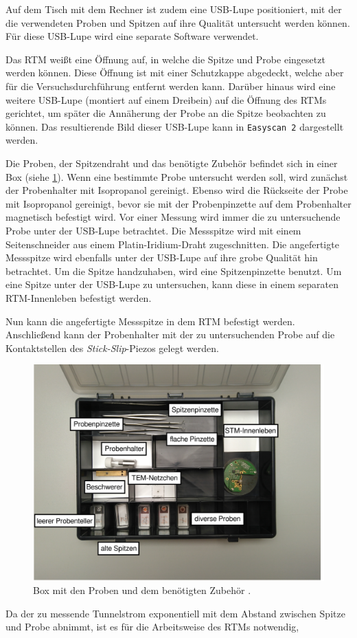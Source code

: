 Auf dem Tisch mit dem Rechner ist zudem eine USB-Lupe positioniert, mit der die verwendeten Proben und Spitzen auf ihre Qualität untersucht werden können.
Für diese USB-Lupe wird eine separate Software verwendet.\par
Das RTM weißt eine Öffnung auf, in welche die Spitze und Probe eingesetzt werden können. Diese Öffnung ist mit einer Schutzkappe abgedeckt, welche aber für
die Versuchsdurchführung entfernt werden kann. Darüber hinaus wird eine weitere USB-Lupe (montiert auf einem Dreibein) auf die Öffnung des RTMs gerichtet,
um später die Annäherung der Probe an die Spitze beobachten zu können. Das resultierende Bild dieser USB-Lupe kann in \texttt{Easyscan 2} dargestellt werden.\par
Die Proben, der Spitzendraht und das benötigte Zubehör befindet sich in einer Box (siehe \cref{fig:koffer}). Wenn eine bestimmte Probe untersucht werden soll,
wird zunächst der Probenhalter mit Isopropanol gereinigt. Ebenso wird die Rückseite der Probe mit Isopropanol gereinigt, bevor sie mit der Probenpinzette
auf dem Probenhalter magnetisch befestigt wird. Vor einer Messung wird immer die zu untersuchende Probe unter der USB-Lupe betrachtet. Die Messspitze wird mit einem
Seitenschneider aus einem Platin-Iridium-Draht zugeschnitten. Die angefertigte Messspitze wird ebenfalls unter der USB-Lupe auf ihre grobe Qualität hin betrachtet.
Um die Spitze handzuhaben, wird eine Spitzenpinzette benutzt. Um eine Spitze unter der USB-Lupe zu untersuchen, kann diese in einem separaten RTM-Innenleben befestigt werden.\par
Nun kann die angefertigte Messspitze in dem RTM befestigt werden. Anschließend kann der Probenhalter mit der zu untersuchenden Probe auf die Kontaktstellen
des \textit{Stick-Slip}-Piezos gelegt werden.
\begin{figure}[H]
	\centering
	\includegraphics[width=0.8\linewidth]{../figs/koffer.png}
	\caption{Box mit den Proben und dem benötigten Zubehör \cite{skript}.}
	\label{fig:koffer}
\end{figure} Da der zu messende Tunnelstrom exponentiell mit dem Abstand zwischen Spitze und Probe abnimmt, ist es für die Arbeitsweise des RTMs notwendig,
